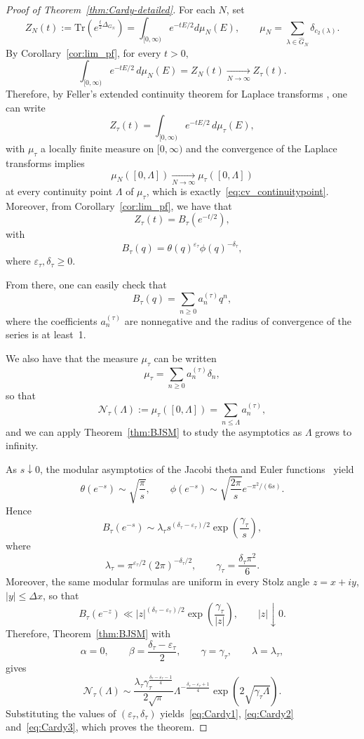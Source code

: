 \documentclass[11pt,a4paper,reqno]{article}
\theoremstyle{definition}
\theoremstyle{remark}
\newcommand\Tr{\mathrm{Tr}}
\begin{document}
\begin{proof}[Proof of Theorem~\ref{thm:Cardy-detailed}]
For each $N$, set
\[
Z_N(t):=\Tr\left(e^{\frac t2\Delta_{G_N}}\right)
=\int_{[0,\infty)} e^{-tE/2}d\mu_N(E),
\qquad
\mu_N=\sum_{\lambda\in\widehat G_N}\delta_{c_2(\lambda)}.
\]
By Corollary~\ref{cor:lim_pf}, for every $t>0,$
\[
\int_{[0,\infty)} e^{-tE/2}\,d\mu_N(E)=Z_N(t)\xrightarrow[N \rightarrow\infty]{} Z_\tau(t).
\]
Therefore, by Feller's extended continuity theorem for Laplace transforms \cite[Ch. XIII, \S 1, Theorem 2a]{FellerII}, one can write 
\[
Z_\tau(t)=\int_{[0,\infty)}e^{-tE/2}\,d\mu_\tau(E),
\]
with $\mu_\tau$ a locally finite measure on $[0, \infty)$ and  the convergence of the Laplace transforms implies
\[
\mu_N([0,\Lambda])\xrightarrow[N \rightarrow\infty]{} \mu_\tau([0,\Lambda])
\]
at every continuity point $\Lambda$ of $\mu_\tau$, which is exactly~\eqref{eq:cv_continuitypoint}.\\

Moreover, from Corollary~\ref{cor:lim_pf}, we have that
\[  Z_\tau(t) = B_\tau(e^{-t/2}),\]
with 
\[ B_\tau(q) = \theta(q)^{\varepsilon_\tau}\phi(q)^{-\delta_\tau},\]
where $\varepsilon_\tau, \delta_\tau \geq 0.$

From there, one can easily check that 
\[
B_\tau(q)=\sum_{n\geq 0} a_n^{(\tau)} q^n,
\]
where  the coefficients $a_n^{(\tau)}$ are nonnegative and the radius of convergence of the series is at least~1.

We also have that the measure $\mu_\tau$ can be written
\[
\mu_\tau=\sum_{n\geq 0} a_n^{(\tau)}\delta_n,
\]
so that
\[
\mathcal{N}_\tau(\Lambda):=\mu_\tau([0,\Lambda])=\sum_{n\leq\Lambda} a_n^{(\tau)},
\]
and we can apply   Theorem~\ref{thm:BJSM} to study the asymptotics as $\Lambda$ grows to infinity.

As $s\downarrow 0$, the modular asymptotics of the Jacobi theta and Euler functions~\cite{FlaSed09} yield
\[
\theta(e^{-s})\sim \sqrt{\frac{\pi}{s}},
\qquad
\phi(e^{-s})\sim \sqrt{\frac{2\pi}{s}}e^{-\pi^2/(6s)}.
\]
Hence
\[
B_\tau(e^{-s})
\sim \lambda_\tau s^{(\delta_\tau-\varepsilon_\tau)/2}
\exp\left(\frac{\gamma_\tau}{s}\right),
\]
where
\[
\lambda_\tau=\pi^{\varepsilon_\tau/2}(2\pi)^{-\delta_\tau/2},
\qquad
\gamma_\tau=\frac{\delta_\tau\pi^2}{6}.
\]
Moreover, the same modular formulas are uniform in every Stolz angle
$z=x+iy$, $|y|\leq\Delta x$, so that
\[
B_\tau(e^{-z})\ll |z|^{(\delta_\tau-\varepsilon_\tau)/2}
\exp\left(\frac{\gamma_\tau}{|z|}\right),
\qquad |z|\downarrow 0.
\]
Therefore, Theorem~\ref{thm:BJSM}  with
\[
\alpha=0,\qquad
\beta=\frac{\delta_\tau-\varepsilon_\tau}{2},\qquad
\gamma=\gamma_\tau,\qquad
\lambda=\lambda_\tau,
\]
 gives
\[
\mathcal{N}_\tau(\Lambda)
\sim
\frac{\lambda_\tau\gamma_\tau^{\frac{\delta_\tau-\varepsilon_\tau-1}{4}}}
{2\sqrt{\pi}}
\Lambda^{-\frac{\delta_\tau-\varepsilon_\tau+1}{4}}
\exp\left(2\sqrt{\gamma_\tau\Lambda}\right).
\]
Substituting the values of $(\varepsilon_\tau,\delta_\tau)$ yields~\eqref{eq:Cardy1}, \eqref{eq:Cardy2} and~\eqref{eq:Cardy3}, which proves the theorem.
\end{proof}
\end{document}
